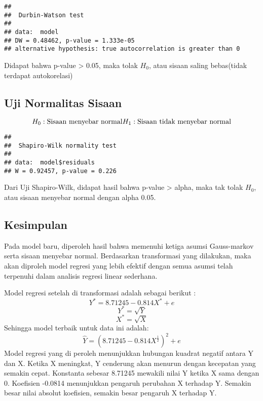 \documentclass[
]{article}
\newenvironment{Shaded}{\begin{snugshade}}{\end{snugshade}}
\newcommand{\FunctionTok}[1]{\textcolor[rgb]{0.13,0.29,0.53}{\textbf{#1}}}
\newcommand{\NormalTok}[1]{#1}
\newcommand{\SpecialCharTok}[1]{\textcolor[rgb]{0.81,0.36,0.00}{\textbf{#1}}}
\begin{document}
\begin{verbatim}
## 
##  Durbin-Watson test
## 
## data:  model
## DW = 0.48462, p-value = 1.333e-05
## alternative hypothesis: true autocorrelation is greater than 0
\end{verbatim}

Didapat bahwa p-value \textgreater{} 0.05, maka tolak \(H_0\), atau
sisaan saling bebas(tidak terdapat autokorelasi)

\hypertarget{uji-normalitas-sisaan-1}{%
\subsection{Uji Normalitas Sisaan}\label{uji-normalitas-sisaan-1}}

\[
H_0 : \text{Sisaan menyebar normal}\\H_1 : \text{Sisaan tidak menyebar normal}
\]

\begin{Shaded}
\end{Shaded}

\begin{verbatim}
## 
##  Shapiro-Wilk normality test
## 
## data:  model$residuals
## W = 0.92457, p-value = 0.226
\end{verbatim}

Dari Uji Shapiro-Wilk, didapat hasil bahwa p-value \textgreater{} alpha,
maka tak tolak \(H_0\), atau sisaan menyebar normal dengan alpha 0.05.

\hypertarget{kesimpulan-1}{%
\subsection{Kesimpulan}\label{kesimpulan-1}}

Pada model baru, diperoleh hasil bahwa memenuhi ketiga asumsi
Gauss-markov serta sisaan menyebar normal. Berdasarkan transformasi yang
dilakukan, maka akan diproleh model regresi yang lebih efektif dengan
semua asumsi telah terpenuhi dalam analisis regresi linear sederhana.

Model regresi setelah di transformasi adalah sebagai berikut :
\[Y^*=8.71245-0.814X^* + e\] \[Y^* = \sqrt Y\] \[X^* = \sqrt X \]
Sehingga model terbaik untuk data ini adalah:
\[\hat Y=(8.71245-0.814X^\frac12)^2 + e\] Model regresi yang di peroleh
menunjukkan hubungan kuadrat negatif antara Y dan X. Ketika X meningkat,
Y cenderung akan menurun dengan kecepatan yang semakin cepat. Konstanta
sebesar 8.71245 mewakili nilai Y ketika X sama dengan 0. Koefisien
-0.0814 menunjukkan pengaruh perubahan X terhadap Y. Semakin besar nilai
absolut koefisien, semakin besar pengaruh X terhadap Y.
\end{document}
